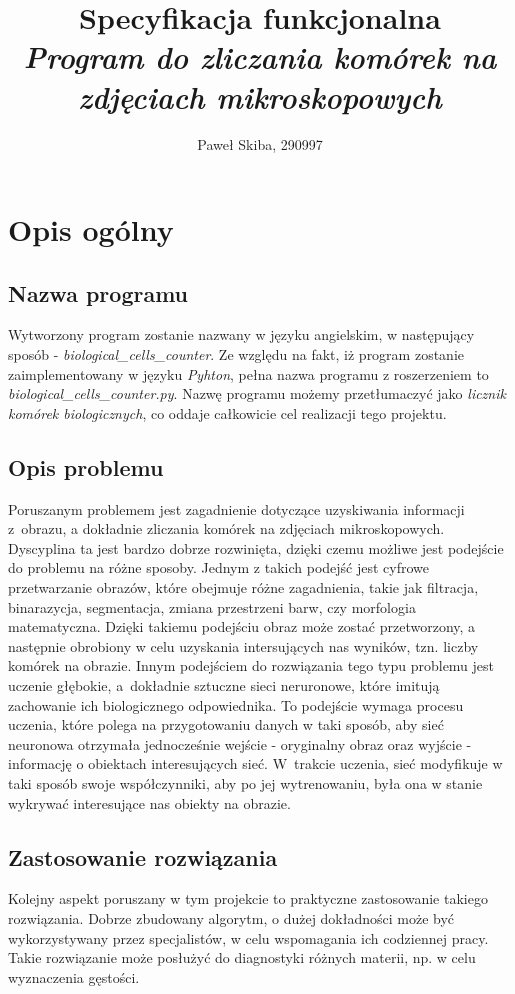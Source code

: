 \documentclass[a4paper]{article}
\title{\textbf{Specyfikacja funkcjonalna} \\ \textit{Program do zliczania komórek na zdjęciach mikroskopowych}}
\author{Paweł Skiba, 290997}
\begin{document}
\maketitle
\thispagestyle{empty}
\tableofcontents

\newpage

\section{Opis ogólny}
\subsection{Nazwa programu}
Wytworzony program zostanie nazwany w języku angielskim, w następujący sposób - \textit{biological\_cells\_counter}. Ze względu na fakt, iż program zostanie zaimplementowany w języku \textit{Pyhton}, pełna nazwa programu z roszerzeniem to \textit{biological\_cells\_counter.py}. Nazwę programu możemy przetłumaczyć jako \textit{licznik komórek biologicznych}, co oddaje całkowicie cel realizacji tego projektu.
\subsection{Opis problemu}
Poruszanym problemem jest zagadnienie dotyczące uzyskiwania informacji z~obrazu, a dokładnie zliczania komórek na zdjęciach mikroskopowych. Dyscyplina ta jest bardzo dobrze rozwinięta, dzięki czemu możliwe jest podejście do problemu na różne sposoby. Jednym z takich podejść jest cyfrowe przetwarzanie obrazów, które obejmuje różne zagadnienia, takie jak filtracja, binarazycja, segmentacja, zmiana przestrzeni barw, czy morfologia matematyczna. Dzięki takiemu podejściu obraz może zostać przetworzony, a następnie obrobiony w celu uzyskania intersujących nas wyników, tzn. liczby komórek na obrazie. Innym podejściem do rozwiązania tego typu problemu jest uczenie głębokie, a~dokładnie sztuczne sieci neruronowe, które imitują zachowanie ich biologicznego odpowiednika. To podejście wymaga procesu uczenia, które polega na przygotowaniu danych w taki sposób, aby sieć neuronowa otrzymała jednocześnie wejście - oryginalny obraz oraz wyjście - informację o obiektach interesujących sieć. W~trakcie uczenia, sieć modyfikuje w taki sposób swoje współczynniki, aby po jej wytrenowaniu, była ona w stanie wykrywać interesujące nas obiekty na obrazie.
\subsection{Zastosowanie rozwiązania}
Kolejny aspekt poruszany w tym projekcie to praktyczne zastosowanie takiego rozwiązania. Dobrze zbudowany algorytm, o dużej dokładności może być wykorzystywany przez specjalistów, w celu wspomagania ich codziennej pracy. Takie rozwiązanie może posłużyć do diagnostyki różnych materii, np. w celu wyznaczenia gęstości.
\end{document}
